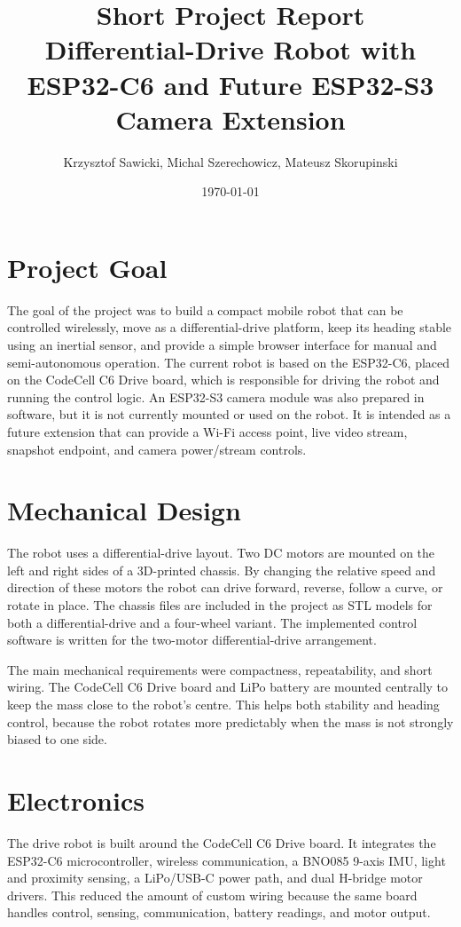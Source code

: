 \documentclass[11pt,a4paper]{article}
\title{Short Project Report\\Differential-Drive Robot with ESP32-C6 and Future ESP32-S3 Camera Extension}
\author{Krzysztof Sawicki, Michal Szerechowicz, Mateusz Skorupinski}
\date{\today}
\begin{document}
\maketitle

\section{Project Goal}

The goal of the project was to build a compact mobile robot that can be
controlled wirelessly, move as a differential-drive platform, keep its heading
stable using an inertial sensor, and provide a simple browser interface for
manual and semi-autonomous operation. The current robot is based on the
ESP32-C6, placed on the CodeCell C6 Drive board, which is responsible for
driving the robot and running the control logic. An ESP32-S3 camera module was
also prepared in software, but it is not currently mounted or used on the
robot. It is intended as a future extension that can provide a Wi-Fi access
point, live video stream, snapshot endpoint, and camera power/stream controls.

\section{Mechanical Design}

The robot uses a differential-drive layout. Two DC motors are mounted on the
left and right sides of a 3D-printed chassis. By changing the relative speed
and direction of these motors the robot can drive forward, reverse, follow a
curve, or rotate in place. The chassis files are included in the project as STL
models for both a differential-drive and a four-wheel variant. The implemented
control software is written for the two-motor differential-drive arrangement.

The main mechanical requirements were compactness, repeatability, and short
wiring. The CodeCell C6 Drive board and LiPo battery are mounted centrally to
keep the mass close to the robot's centre. This helps both stability and
heading control, because the robot rotates more predictably when the mass is
not strongly biased to one side.

\section{Electronics}

The drive robot is built around the CodeCell C6 Drive board. It integrates the
ESP32-C6 microcontroller, wireless communication, a BNO085 9-axis IMU, light
and proximity sensing, a LiPo/USB-C power path, and dual H-bridge motor drivers.
This reduced the amount of custom wiring because the same board handles
control, sensing, communication, battery readings, and motor output.
\end{document}
